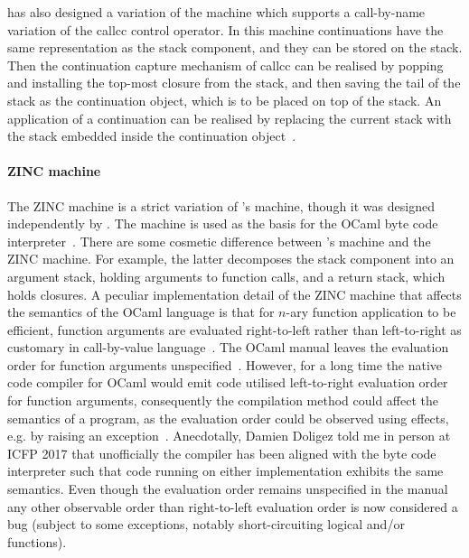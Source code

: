 \documentclass[12pt,phd,lfcs,twoside,openright,logo,leftchapter,normalheadings]{infthesis}
\theoremstyle{plain}
\theoremstyle{definition}
\begin{document}
\citet{Krivine07} has also designed a variation of the machine which
supports a call-by-name variation of the callcc control operator. In
this machine continuations have the same representation as the stack
component, and they can be stored on the stack. Then the continuation
capture mechanism of callcc can be realised by popping and installing
the top-most closure from the stack, and then saving the tail of the
stack as the continuation object, which is to be placed on top of the
stack. An application of a continuation can be realised by replacing
the current stack with the stack embedded inside the continuation
object~\cite{Krivine07}.


\paragraph{ZINC machine} The ZINC machine is a strict variation of
\citeauthor{Krivine07}'s machine, though it was designed independently
by \citet{Leroy90}. The machine is used as the basis for the OCaml
byte code interpreter~\cite{Leroy90,LeroyDFGRV20}.
%
There are some cosmetic difference between \citeauthor{Krivine07}'s
machine and the ZINC machine. For example, the latter decomposes the
stack component into an argument stack, holding arguments to function
calls, and a return stack, which holds closures.
%
A peculiar implementation detail of the ZINC machine that affects the
semantics of the OCaml language is that for $n$-ary function
application to be efficient, function arguments are evaluated
right-to-left rather than left-to-right as customary in call-by-value
language~\cite{Leroy90}. The OCaml manual leaves the evaluation order
for function arguments unspecified~\cite{LeroyDFGRV20}. However, for a
long time the native code compiler for OCaml would emit code utilised
left-to-right evaluation order for function arguments, consequently
the compilation method could affect the semantics of a program, as the
evaluation order could be observed using effects, e.g. by raising an
exception~\cite{CartwrightF92}. Anecdotally, Damien Doligez told me in
person at ICFP 2017 that unofficially the compiler has been aligned
with the byte code interpreter such that code running on either
implementation exhibits the same semantics. Even though the evaluation
order remains unspecified in the manual any other observable order
than right-to-left evaluation order is now considered a bug (subject
to some exceptions, notably short-circuiting logical and/or
functions).
\end{document}
